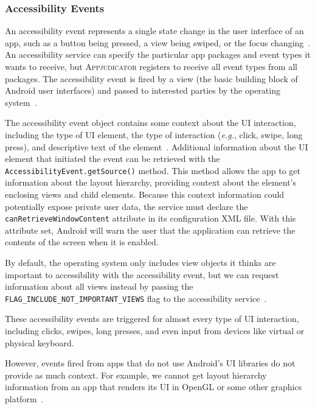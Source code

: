 \subsubsection{Accessibility Events}
\label{sec:accessibility-events}

An accessibility event represents a single state change in the user interface of
an app, such as a button being pressed, a view being swiped, or the focus
changing~\cite{accessibilityserviceguide}. An accessibility service can specify
the particular app packages and event types it wants to receive, but
\textsc{Appjudicator} registers to receive all event types from all packages.
The accessibility event is fired by a view (the basic building block of Android
user interfaces) and passed to interested parties by the operating
system~\cite{googledevelopersevent}.

The accessibility event object contains some context about the UI interaction,
including the type of UI element, the type of interaction (\textit{e.g.}, click,
swipe, long press), and descriptive text of the
element~\cite{accessibilityserviceguide}. Additional information about the UI
element that initiated the event can be retrieved with the
\texttt{AccessibilityEvent.getSource()} method. This method allows the app to
get information about the layout hierarchy, providing context about the
element's enclosing views and child elements. Because this context information
could potentially expose private user data, the service must declare the
\texttt{canRetrieveWindowContent} attribute in its configuration XML file. With
this attribute set, Android will warn the user that the application can retrieve
the contents of the screen when it is enabled.

By default, the operating system only includes view objects it thinks are
important to accessibility with the accessibility event, but we can request
information about all views instead by passing the 
\texttt{FLAG\_INCLUDE\_NOT\_IMPORTANT\_VIEWS} flag to the accessibility
service~\cite{accessibilityserviceguide}.

These accessibility events are triggered for almost every type of UI interaction,
including clicks, swipes, long presses, and even input from devices like virtual
or physical keyboard.

However, events fired from apps that do not use Android's
UI libraries do not provide as much context. For example, we cannot get layout
hierarchy information from an app that renders its UI in OpenGL or some other
graphics platform~\cite{accessibilityserviceguide}. 

